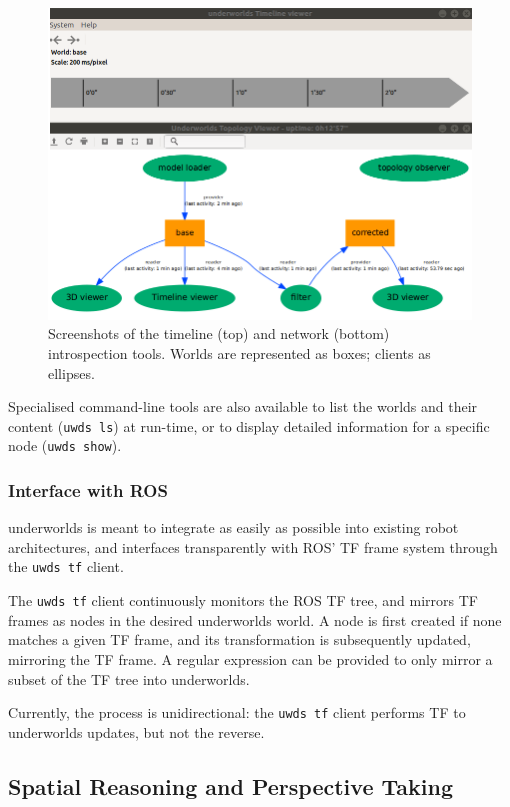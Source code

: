 \documentclass[conference]{IEEEtran}
\newcommand{\uwds}{{\sc underworlds}\xspace}
\begin{document}
\begin{figure}
    \centering
    \includegraphics[width=\linewidth]{tools}
    \caption{Screenshots of the timeline (top) and network (bottom)
    introspection tools. Worlds are represented as boxes; clients as ellipses.}
    \label{fig|explorer}
\end{figure}

Specialised command-line tools are also available to list the worlds
and their content ({\tt uwds ls}) at run-time, or to display detailed information for a
specific node ({\tt uwds show}).

\subsubsection{Interface with ROS}

\uwds is meant to integrate as easily as possible into existing robot
architectures, and interfaces transparently with ROS' TF frame system through
the {\tt uwds tf} client.

The {\tt uwds tf} client continuously monitors the ROS TF tree, and mirrors
TF frames as nodes in the desired \uwds world. A node is first created if none
matches a given TF frame, and its transformation is subsequently updated,
mirroring the TF frame. A regular expression can be provided to only mirror a
subset of the TF tree into \uwds.

Currently, the process is unidirectional: the {\tt uwds tf} client performs TF
to \uwds updates, but not the reverse.

\subsection{Spatial Reasoning and Perspective Taking}
\end{document}
